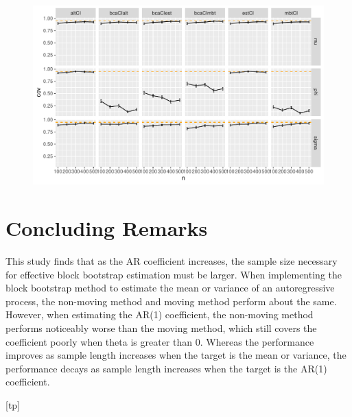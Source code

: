 \documentclass[12pt, letterpaper, titlepage]{article}
\begin{document}
\begin{figure}[tbp]
\caption{}
  \centering
  \includegraphics[width=\textwidth]{figures/plot_.4}
  \caption{}
  \label{fig:plot_.4}
\end{figure}

\section{Concluding Remarks}
\label{sec:conremarks}

This study finds that as the AR coefficient increases, the sample size necessary for effective block bootstrap estimation must be larger. When implementing the block bootstrap method to estimate the mean or variance of an autoregressive process, the non-moving method and moving method perform about the same. However, when estimating the AR(1) coefficient, the non-moving method performs noticeably worse than the moving method, which still covers the coefficient poorly when theta is greater than 0. Whereas the performance improves as sample length increases when the target is the mean or variance, the performance decays as sample length increases when the target is the AR(1) coefficient.



[tp]
\end{document}
